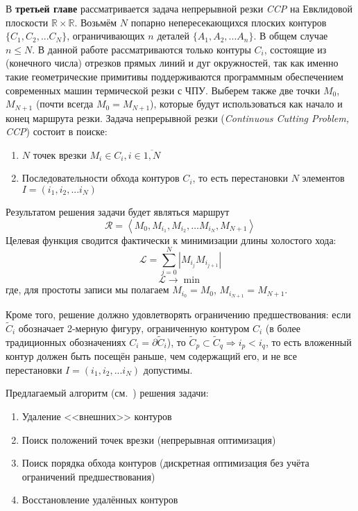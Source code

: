 
В {\bf третьей главе}
рассматривается задача непрерывной резки {\it CCP}
на Евклидовой плоскости
$\mathbb R \times \mathbb R$.
Возьмём
$N$
попарно непересекающихся плоских контуров
$\{C_1, C_2, ... C_N\}$,
ограничивающих
$n$
деталей
$\{A_1, A_2, ... A_n\}$.
В общем случае
$n \leqslant N$.
В данной работе рассматриваются только контуры
$C_i$,
состоящие из
(конечного числа)
отрезков прямых линий и дуг окружностей,
так как именно такие геометрические примитивы
поддерживаются программным обеспечением
современных машин термической резки с ЧПУ.
Выберем также две точки
$M_0$, $M_{N + 1}$
(почти всегда $M_0 = M_{N + 1}$),
которые будут использоваться
как начало и конец
маршрута резки.
Задача непрерывной резки
({\it Continuous Cutting Problem, CCP})
состоит в поиске:
\begin{enumerate}
\item
$N$ точек врезки $M_i \in C_i, i \in \overline{1, N}$
\item
Последовательности обхода контуров
$C_i$,
то есть перестановки
$N$
элементов
$I = (i_1, i_2, ... i_N)$
\end{enumerate}
Результатом решения задачи будет являться маршрут
\begin{equation}
  \label{eq:route}
  \mathcal R =
  \left<M_0, M_{i_1}, M_{i_2}, \dots M_{i_N}, M_{N + 1}\right>
\end{equation}
Целевая функция
сводится фактически к минимизации длины холостого хода:
\begin{equation}
  \mathcal{L} = \sum_{j=0}^N|M_{i_j}M_{i_{j+1}}|
  \label{air-move-length}
\end{equation}
$$
\mathcal{L} \to \min
$$
где, для простоты записи мы полагаем
$M_{i_0} = M_0$,
$M_{i_{N + 1}} = M_{N + 1}$.

Кроме того, решение должно удовлетворять ограничению предшествования:
если
$\widetilde C_i$
обозначает 2-мерную фигуру,
ограниченную контуром
$C_i$
(в более традиционных обозначениях
$C_i = \partial \widetilde C_i$),
то
$
 \widetilde C_p \subset \widetilde C_q \Rightarrow i_p < i_q
$,
то есть вложенный контур должен быть посещён раньше,
чем содержащий его,
и не все перестановки
$I = (i_1, i_2, ... i_N)$
допустимы.

Предлагаемый алгоритм
(см.~\cite{berlin2019,bi:ccp:ru})
решения задачи:

\begin{enumerate}
  \item Удаление <<внешних>> контуров
  \item Поиск положений точек врезки (непрерывная оптимизация)
  \item Поиск порядка обхода контуров (дискретная оптимизация без учёта ограничений предшествования)
  \item Восстановление удалённых контуров
\end{enumerate}

